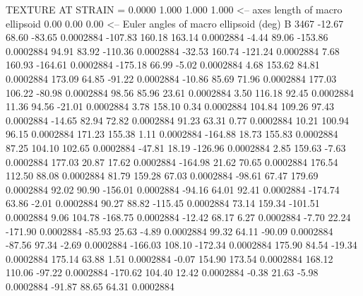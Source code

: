 TEXTURE AT STRAIN =    0.0000
   1.000   1.000   1.000  <-- axes length of macro ellipsoid
    0.00    0.00    0.00  <-- Euler angles of macro ellipsoid (deg)
B      3467
      -12.67       68.60      -83.65     0.0002884
     -107.83      160.18      163.14     0.0002884
       -4.44       89.06     -153.86     0.0002884
       94.91       83.92     -110.36     0.0002884
      -32.53      160.74     -121.24     0.0002884
        7.68      160.93     -164.61     0.0002884
     -175.18       66.99       -5.02     0.0002884
        4.68      153.62       84.81     0.0002884
      173.09       64.85      -91.22     0.0002884
      -10.86       85.69       71.96     0.0002884
      177.03      106.22      -80.98     0.0002884
       98.56       85.96       23.61     0.0002884
        3.50      116.18       92.45     0.0002884
       11.36       94.56      -21.01     0.0002884
        3.78      158.10        0.34     0.0002884
      104.84      109.26       97.43     0.0002884
      -14.65       82.94       72.82     0.0002884
       91.23       63.31        0.77     0.0002884
       10.21      100.94       96.15     0.0002884
      171.23      155.38        1.11     0.0002884
     -164.88       18.73      155.83     0.0002884
       87.25      104.10      102.65     0.0002884
      -47.81       18.19     -126.96     0.0002884
        2.85      159.63       -7.63     0.0002884
      177.03       20.87       17.62     0.0002884
     -164.98       21.62       70.65     0.0002884
      176.54      112.50       88.08     0.0002884
       81.79      159.28       67.03     0.0002884
      -98.61       67.47      179.69     0.0002884
       92.02       90.90     -156.01     0.0002884
      -94.16       64.01       92.41     0.0002884
     -174.74       63.86       -2.01     0.0002884
       90.27       88.82     -115.45     0.0002884
       73.14      159.34     -101.51     0.0002884
        9.06      104.78     -168.75     0.0002884
      -12.42       68.17        6.27     0.0002884
       -7.70       22.24     -171.90     0.0002884
      -85.93       25.63       -4.89     0.0002884
       99.32       64.11      -90.09     0.0002884
      -87.56       97.34       -2.69     0.0002884
     -166.03      108.10     -172.34     0.0002884
      175.90       84.54      -19.34     0.0002884
      175.14       63.88        1.51     0.0002884
       -0.07      154.90      173.54     0.0002884
      168.12      110.06      -97.22     0.0002884
     -170.62      104.40       12.42     0.0002884
       -0.38       21.63       -5.98     0.0002884
      -91.87       88.65       64.31     0.0002884
